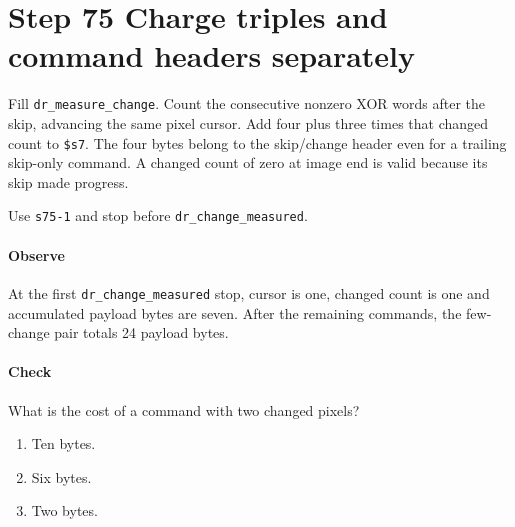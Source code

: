 \section{Step 75 Charge triples and command headers separately}
Fill \texttt{dr\_measure\_change}. Count the consecutive nonzero XOR words after the skip, advancing the same pixel cursor. Add four plus three times that changed count to \texttt{\$s7}. The four bytes belong to the skip/change header even for a trailing skip-only command. A changed count of zero at image end is valid because its skip made progress.

Use \texttt{s75-1} and stop before \texttt{dr\_change\_measured}.

\paragraph{Observe} At the first \texttt{dr\_change\_measured} stop, cursor is one, changed count is one and accumulated payload bytes are seven. After the remaining commands, the few-change pair totals 24 payload bytes.

\paragraph{Check} What is the cost of a command with two changed pixels?
\begin{enumerate}[label=\Alph*.]
\item Ten bytes.
\item Six bytes.
\item Two bytes.
\end{enumerate}
